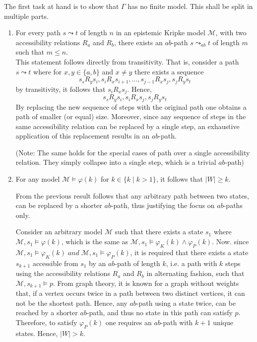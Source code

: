 \documentclass[11pt,a4paper]{article}
\newcommand{\sand}{\; and \;}
\begin{document}
The first task at hand is to show that $\Gamma$ has no finite model. This shall be split in multiple parts.
\begin{enumerate}
\item For every path $s \leadsto t$ of length $n$ in an epistemic Kripke model $\mathcal{M}$, with two accessibility relations $R_a$ and $R_b$, there exists an $ab$-path $s \leadsto_{ab} t$ of length $m$ such that $m \leq n$. \\

This statement follows directly from transitivity. That is, consider a path $s \leadsto t$ where for $x,y \in \{a,b\}$ and $x \neq y$ there exists a sequence
\begin{equation*}
s_sR_ys_i, s_iR_xs_{i+1}, \dots, s_{j-1}R_xs_j, s_jR_ys_t
\end{equation*}
by transitivity, it follows that $s_iR_xs_j$. Hence, 
\begin{equation*}
s_sR_ys_i, s_iR_xs_j, s_jR_ys_t
\end{equation*}
By replacing the new sequence of steps with the original path one obtains a path of smaller (or equal) size. Moreover, since any sequence of steps in the same accessibility relation can be replaced by a single step, an exhaustive application of this replacement results in an $ab$-path.

(Note: The same holds for the special cases of path over a single accessibility relation. They simply collapse into a single step, which is a trivial $ab$-path)


\item For any model $\mathcal{M} \models \varphi(k)$ for $k \in \{k \mid k>1\}$, it follows that $|W|\geq k$.

From the previous result follows that any arbitrary path between two states, can be replaced by a shorter $ab$-path, thus justifying the focus on $ab$-paths only.

Consider an arbitrary model $\mathcal{M}$ such that there exists a state $s_1$ where $\mathcal{M},s_1 \models \varphi(k)$, which is the same as $\mathcal{M},s_1 \models \varphi_K(k) \land \varphi_P(k)$. Now. since $\mathcal{M},s_1 \models \varphi_K(k) \sand  \mathcal{M},s_1 \models \varphi_P(k)$, it is required that there exists a state $s_{k+1}$ accessible from $s_1$ by an $ab$-path of length $k$, i.e. a path with $k$ steps using the accessibility relations $R_a$ and $R_b$ in alternating fashion, such that $\mathcal{M}, s_{k+1} \models p$. From graph theory, it is known for a graph without weights that, if a vertex occurs twice in a path between two distinct vertices, it can not be the shortest path. Hence, any $ab$-path using a state twice, can be reached by a shorter $ab$-path, and thus no state in this path can satisfy $p$. Therefore, to satisfy $\varphi_P(k)$ one requires an $ab$-path with $k+1$ unique states. Hence, $|W|>k$.


\end{enumerate}
\end{document}
